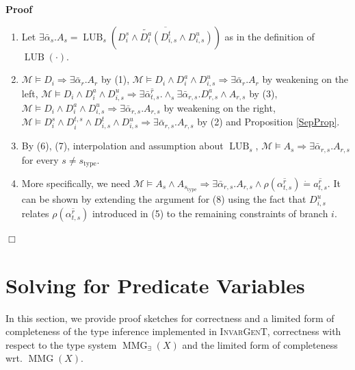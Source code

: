 \documentclass{article}
\newcommand{\tmname}[1]{\textsc{#1}}
\newcommand{\tmop}[1]{\ensuremath{\operatorname{#1}}}
\newenvironment{proof}{\noindent\textbf{Proof\ }}{\hspace*{\fill}$\Box$\medskip}
\begin{document}
\begin{proof}
\begin{enumerate}
    \item Let $\exists \bar{\alpha}_s .A_s = \tmop{LUB}_s \left(
    \overline{D_i^s \wedge \widetilde{D^a_i} (D^t_{i, s} \wedge D^u_{i, s})}
    \right)$ as in the definition of $\tmop{LUB} (\cdot)$.
    
    \item $\mathcal{M} \vDash D_i \Rightarrow \exists \bar{\alpha}_r .A_r$ by
    (1), $\mathcal{M} \vDash D_i \wedge D_i^a \wedge D^u_{i, s} \Rightarrow
    \exists \bar{\alpha}_r .A_r$ by weakening on the left, $\mathcal{M} \vDash
    D_i \wedge D_i^a \wedge D^u_{i, s} \Rightarrow \exists
    \overline{\bar{\alpha}_{t, s}^r} . \wedge_s \exists \bar{\alpha}_{r, s}
    .D_{r, s}^a \wedge A_{r, s}$ by (3), $\mathcal{M} \vDash D_i \wedge D_i^a
    \wedge D^u_{i, s} \Rightarrow \exists \bar{\alpha}_{r, s} .A_{r, s}$ by
    weakening on the right, $\mathcal{M} \vDash D_i^s \wedge D_i^{t, s} \wedge
    D^t_{i, s} \wedge D^u_{i, s} \Rightarrow \exists \bar{\alpha}_{r, s}
    .A_{r, s}$ by (2) and Proposition \ref{SepProp}.
    
    \item By (6), (7), interpolation and assumption about $\tmop{LUB}_s$,
    $\mathcal{M} \vDash A_s \Rightarrow \exists \bar{\alpha}_{r, s} .A_{r, s}$
    for every $s \neq s_{\tmop{type}}$.
    
    \item More specifically, we need $\mathcal{M} \vDash A_s \wedge
    A_{s_{\tmop{type}}} \Rightarrow \exists \bar{\alpha}_{r, s} .A_{r, s}
    \wedge \rho (\overline{\alpha^r_{t, s}}) \dot{=} \overline{a^r_{t, s}}$.
    It can be shown by extending the argument for (8) using the fact that
    $D^u_{i, s}$ relates $\rho (\overline{\alpha^r_{t, s}})$ introduced in (5)
    to the remaining constraints of branch $i$.
  \end{enumerate}
\end{proof}

\section{Solving for Predicate Variables}\label{PredVarProofs}

In this section, we provide proof sketches for correctness and a limited form
of completeness of the type inference implemented in {\tmname{InvarGenT}},
correctness with respect to the type system $\tmop{MMG}_{\exists} (X)$ and the
limited form of completeness wrt. $\tmop{MMG} (X)$.
\end{document}
